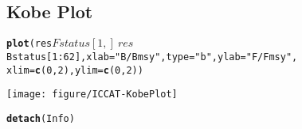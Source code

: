 \documentclass[a4paper]{article}\usepackage{graphicx, color}
\makeatletter
\def\maxwidth{ %
  \ifdim\Gin@nat@width>\linewidth
    \linewidth
  \else
    \Gin@nat@width
  \fi
}
\newcommand{\hlfunctioncall}[1]{\textcolor[rgb]{0.501960784313725,0,0.329411764705882}{\textbf{#1}}}%
\newcommand{\hlstring}[1]{\textcolor[rgb]{0.6,0.6,1}{#1}}%
\newenvironment{kframe}{%
 \def\at@end@of@kframe{}%
 \ifinner\ifhmode%
  \def\at@end@of@kframe{\end{minipage}}%
  \begin{minipage}{\columnwidth}%
 \fi\fi%
 \def\FrameCommand##1{\hskip\@totalleftmargin \hskip-\fboxsep
 \colorbox{shadecolor}{##1}\hskip-\fboxsep
     \hskip-\linewidth \hskip-\@totalleftmargin \hskip\columnwidth}%
 \MakeFramed {\advance\hsize-\width
   \@totalleftmargin\z@ \linewidth\hsize
   \@setminipage}}%
 {\par\unskip\endMakeFramed%
 \at@end@of@kframe}
\newenvironment{knitrout}{}{} %
\makeatother
\begin{document}
\subsection{Kobe Plot}
\begin{knitrout}
\color{fgcolor}\begin{kframe}
\begin{alltt}
\hlfunctioncall{plot}(res$Fstatus[1, ] ~ res$Bstatus[1:62], xlab = \hlstring{"B/Bmsy"}, type = \hlstring{"b"}, ylab = \hlstring{"F/Fmsy"}, 
    xlim = \hlfunctioncall{c}(0, 2), ylim = \hlfunctioncall{c}(0, 2))
\end{alltt}
\end{kframe}

{\centering \texttt{[image: figure/ICCAT-KobePlot]} 

}



\end{knitrout}

\begin{knitrout}
\color{fgcolor}\begin{kframe}
\begin{alltt}
\hlfunctioncall{detach}(Info)
\end{alltt}
\end{kframe}
\end{knitrout}
\end{document}
